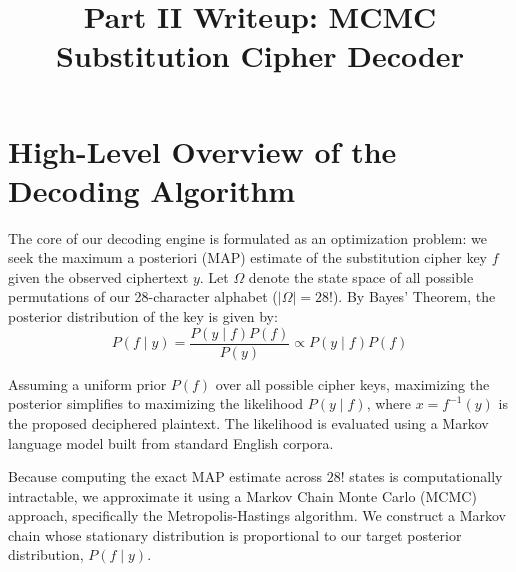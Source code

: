 \documentclass[11pt]{article}
\title{Part II Writeup: MCMC Substitution Cipher Decoder}
\author{}
\date{}
\begin{document}
\maketitle

\section{High-Level Overview of the Decoding Algorithm}

The core of our decoding engine is formulated as an optimization problem: we seek the maximum a posteriori (MAP) estimate of the substitution cipher key $f$ given the observed ciphertext $y$. Let $\Omega$ denote the state space of all possible permutations of our 28-character alphabet ($|\Omega| = 28!$). By Bayes' Theorem, the posterior distribution of the key is given by:
\begin{equation}
    P(f \mid y) = \frac{P(y \mid f)P(f)}{P(y)} \propto P(y \mid f)P(f)
\end{equation}

Assuming a uniform prior $P(f)$ over all possible cipher keys, maximizing the posterior simplifies to maximizing the likelihood $P(y \mid f)$, where $x = f^{-1}(y)$ is the proposed deciphered plaintext. The likelihood is evaluated using a Markov language model built from standard English corpora. 

Because computing the exact MAP estimate across $28!$ states is computationally intractable, we approximate it using a Markov Chain Monte Carlo (MCMC) approach, specifically the Metropolis-Hastings algorithm. We construct a Markov chain whose stationary distribution is proportional to our target posterior distribution, $P(f \mid y)$. 
\end{document}
